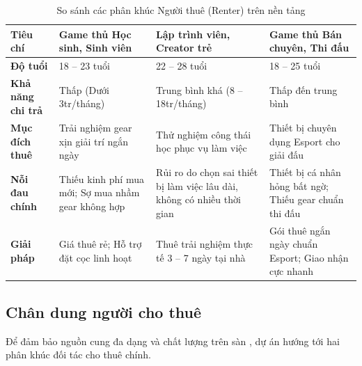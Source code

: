 \begin{table}[H]
    \centering
    \caption{So sánh các phân khúc Người thuê (Renter) trên nền tảng}
    \label{tab:renter-icp}
    \small
    \begin{tabular}{p{3.5cm}p{3.5cm}p{3.5cm}p{3.5cm}}
        \toprule
        \textbf{Tiêu chí} & \textbf{Game thủ Học sinh, Sinh viên} & \textbf{Lập trình viên, Creator trẻ} & \textbf{Game thủ Bán chuyên, Thi đấu} \\
        \midrule
        \textbf{Độ tuổi} & 18 -- 23 tuổi & 22 -- 28 tuổi & 18 -- 25 tuổi \\
        \textbf{Khả năng chi trả} & Thấp (Dưới 3tr/tháng) & Trung bình khá (8 -- 18tr/tháng) & Thấp đến trung bình \\
        \textbf{Mục đích thuê} & Trải nghiệm gear xịn giải trí ngắn ngày & Thử nghiệm công thái học phục vụ làm việc & Thiết bị chuyên dụng Esport cho giải đấu \\
        \textbf{Nỗi đau chính} & Thiếu kinh phí mua mới; Sợ mua nhầm gear không hợp & Rủi ro do chọn sai thiết bị làm việc lâu dài, không có nhiều thời gian & Thiết bị cá nhân hỏng bất ngờ; Thiếu gear chuẩn thi đấu \\
        \textbf{Giải pháp \projectname{}} & Giá thuê rẻ; Hỗ trợ đặt cọc linh hoạt & Thuê trải nghiệm thực tế 3 -- 7 ngày tại nhà & Gói thuê ngắn ngày chuẩn Esport; Giao nhận cực nhanh \\
        \bottomrule
    \end{tabular}
\end{table}

\subsection{Chân dung người cho thuê}

Để đảm bảo nguồn cung đa dạng và chất lượng trên sàn \projectname{}, dự án hướng tới hai phân khúc đối tác cho thuê chính.

